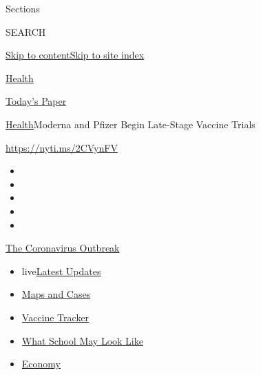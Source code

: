 Sections

SEARCH

\protect\hyperlink{site-content}{Skip to
content}\protect\hyperlink{site-index}{Skip to site index}

\href{https://www.nytimes.com/section/health}{Health}

\href{https://myaccount.nytimes.com/auth/login?response_type=cookie\&client_id=vi}{}

\href{https://www.nytimes.com/section/todayspaper}{Today's Paper}

\href{/section/health}{Health}\textbar{}Moderna and Pfizer Begin
Late-Stage Vaccine Trials

\url{https://nyti.ms/2CVynFV}

\begin{itemize}
\item
\item
\item
\item
\item
\end{itemize}

\href{https://www.nytimes.com/news-event/coronavirus?action=click\&pgtype=Article\&state=default\&region=TOP_BANNER\&context=storylines_menu}{The
Coronavirus Outbreak}

\begin{itemize}
\tightlist
\item
  live\href{https://www.nytimes.com/2020/08/02/world/coronavirus-updates.html?action=click\&pgtype=Article\&state=default\&region=TOP_BANNER\&context=storylines_menu}{Latest
  Updates}
\item
  \href{https://www.nytimes.com/interactive/2020/us/coronavirus-us-cases.html?action=click\&pgtype=Article\&state=default\&region=TOP_BANNER\&context=storylines_menu}{Maps
  and Cases}
\item
  \href{https://www.nytimes.com/interactive/2020/science/coronavirus-vaccine-tracker.html?action=click\&pgtype=Article\&state=default\&region=TOP_BANNER\&context=storylines_menu}{Vaccine
  Tracker}
\item
  \href{https://www.nytimes.com/interactive/2020/07/29/us/schools-reopening-coronavirus.html?action=click\&pgtype=Article\&state=default\&region=TOP_BANNER\&context=storylines_menu}{What
  School May Look Like}
\item
  \href{https://www.nytimes.com/live/2020/07/31/business/stock-market-today-coronavirus?action=click\&pgtype=Article\&state=default\&region=TOP_BANNER\&context=storylines_menu}{Economy}
\end{itemize}

